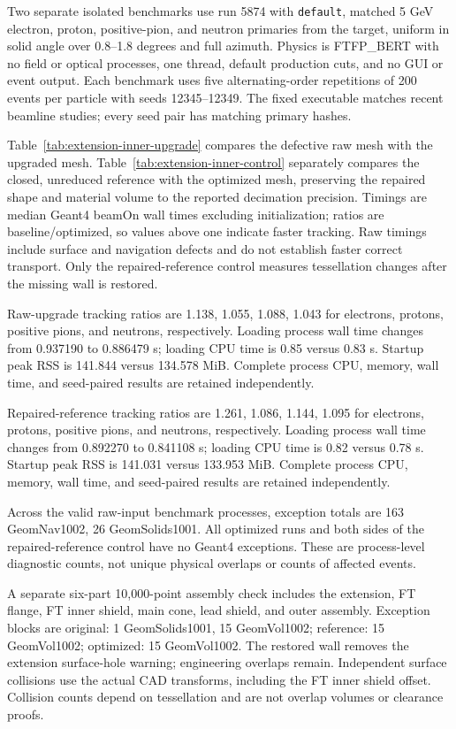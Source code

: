 Two separate isolated benchmarks use run 5874 with \texttt{default}, matched 5 GeV electron, proton,
positive-pion, and neutron primaries from the target, uniform in solid angle over 0.8--1.8 degrees and full
azimuth. Physics is FTFP\_BERT with no field or optical processes, one thread, default production cuts, and no
GUI or event output. Each benchmark uses five alternating-order repetitions of 200 events per particle with
seeds 12345--12349. The fixed executable matches recent beamline studies; every seed pair has matching primary
hashes.

Table~\ref{tab:extension-inner-upgrade} compares the defective raw mesh with the upgraded mesh.
Table~\ref{tab:extension-inner-control} separately compares the closed, unreduced reference with the optimized
mesh, preserving the repaired shape and material volume to the reported decimation precision. Timings are
median Geant4 beamOn wall times excluding initialization; ratios are baseline/optimized, so values above one
indicate faster tracking. Raw timings include surface and navigation defects and do not establish faster
correct transport. Only the repaired-reference control measures tessellation changes after the missing wall is
restored.

Raw-upgrade tracking ratios are 1.138, 1.055, 1.088, 1.043 for electrons, protons, positive pions, and
neutrons, respectively. Loading process wall time changes from 0.937190 to 0.886479 s; loading CPU time is
0.85 versus 0.83 s. Startup peak RSS is 141.844 versus 134.578 MiB. Complete process CPU, memory, wall time,
and seed-paired results are retained independently.

Repaired-reference tracking ratios are 1.261, 1.086, 1.144, 1.095 for electrons, protons, positive pions, and
neutrons, respectively. Loading process wall time changes from 0.892270 to 0.841108 s; loading CPU time is
0.82 versus 0.78 s. Startup peak RSS is 141.031 versus 133.953 MiB. Complete process CPU, memory, wall time,
and seed-paired results are retained independently.

Across the valid raw-input benchmark processes, exception totals are 163 GeomNav1002, 26 GeomSolids1001. All
optimized runs and both sides of the repaired-reference control have no Geant4 exceptions. These are
process-level diagnostic counts, not unique physical overlaps or counts of affected events.

A separate six-part 10,000-point assembly check includes the extension, FT flange, FT inner shield, main cone,
lead shield, and outer assembly. Exception blocks are original: 1 GeomSolids1001, 15 GeomVol1002; reference:
15 GeomVol1002; optimized: 15 GeomVol1002. The restored wall removes the extension surface-hole warning;
engineering overlaps remain. Independent surface collisions use the actual CAD transforms, including the FT
inner shield offset. Collision counts depend on tessellation and are not overlap volumes or clearance proofs.

